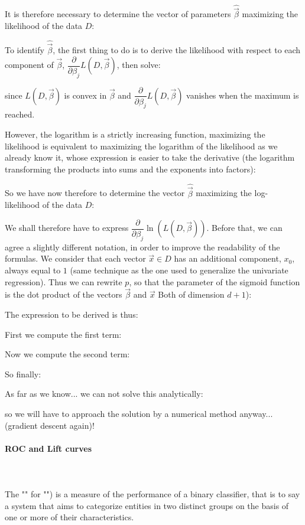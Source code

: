 	It is therefore necessary to determine the vector of parameters $\hat{\vec{\beta}}$ maximizing the likelihood of the data $D$:
	
	To identify $\hat{\vec{\beta}}$, the first thing to do is to derive the likelihood with respect to each component of $\vec{\beta}$, $\dfrac{\partial }{\partial \beta_j}L(D,\vec{\beta})$, then solve:
	
	since $L(D,\vec{\beta})$ is convex in $\vec{\beta}$ and $\dfrac{\partial }{\partial \beta_j}L(D,\vec{\beta})$ vanishes when the maximum is reached.
	
	However, the logarithm is a strictly increasing function, maximizing the likelihood is equivalent to maximizing the logarithm of the likelihood as we already know it, whose expression is easier to take the derivative (the logarithm transforming the products into sums and the exponents into factors):
	
	So we have now therefore to determine the vector $\hat{\vec{\beta}}$ maximizing the log-likelihood of the data $D$:
	
	We shall therefore have to express $\dfrac{\partial }{\partial \beta_j}\ln(L(D,\vec{\beta}))$. Before that, we can agree a slightly different notation, in order to improve the readability of the formulas. We consider that each vector $\vec{x}\in D$ has an additional component, $x_0$, always equal to $1$ (same technique as the one used to generalize the univariate regression). Thus we can rewrite $p$, so that the parameter of the sigmoid function is the dot product of the vectors $\vec{\beta}$ and $\vec{x}$ Both of dimension $d + 1$):
	
	The expression to be derived is thus:
	
	First we compute the first term:
	
	Now we compute the second term:
	
	So finally:
	
	As far as we know... we can not solve this analytically:
	
	so we will have to approach the solution by a numerical method anyway... (gradient descent again)!
	
	\paragraph{ROC and Lift curves}\mbox{}\\\\
	The "" for "") is a measure of the performance of a binary classifier, that is to say a system that aims to categorize entities in two distinct groups on the basis of one or more of their characteristics. 


